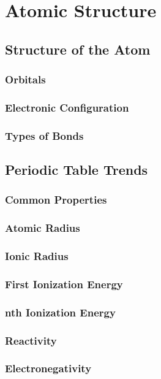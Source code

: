 \documentclass[../main]{subfiles}
\begin{document}
\section{Atomic Structure}

\subsection{Structure of the Atom}

\subsubsection{Orbitals}

\subsubsection{Electronic Configuration}

\subsubsection{Types of Bonds}

\subsection{Periodic Table Trends}

\subsubsection{Common Properties}

\subsubsection{Atomic Radius}

\subsubsection{Ionic Radius}

\subsubsection{First Ionization Energy}

\subsubsection{nth Ionization Energy}

\subsubsection{Reactivity}

\subsubsection{Electronegativity}
\end{document}
